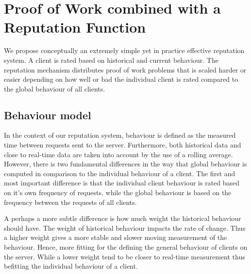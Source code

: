 \section{Proof of Work combined with a Reputation Function}\label{tab:reputation}
We propose conceptually an extremely simple yet in practice effective reputation system. A client is rated based on historical and current behaviour. The reputation mechanism distributes proof of work problems that is scaled harder or easier depending on how well or bad the individual client is rated compared to the global behaviour of all clients. 

\subsection{Behaviour model}\label{tab:behaviourmodel}
In the context of our reputation system, behaviour is defined as the measured time between requests sent to the server. Furthermore, both historical data and close to real-time data are taken into account by the use of a rolling average. However, there is two fundamental differences in the way that global behaviour is computed in comparison to the individual behaviour of a client. The first and most important difference is that the individual client behaviour is rated based on it's own frequency of requests, while the global behaviour is based on the frequency between the requests of all clients. 

A perhaps a more subtle difference is how much weight the historical behaviour should have. The weight of historical behaviour impacts the rate of change. Thus a higher weight gives a more stable and slower moving measurement of the behaviour. Hence, more fitting for the defining the general behaviour of clients on the server. While a lower weight tend to be closer to real-time measurement thus befitting the individual behaviour of a client.